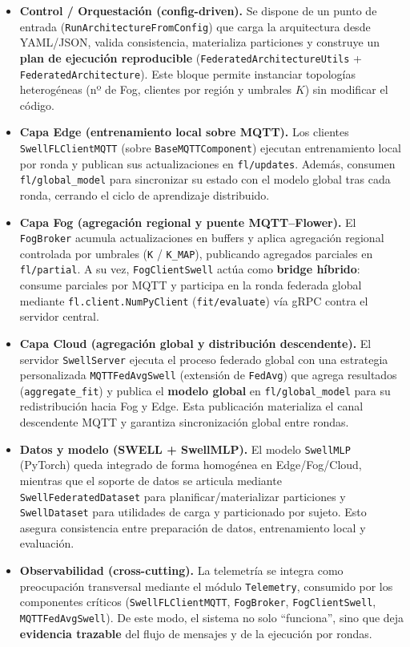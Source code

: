 \documentclass{report}
\begin{document}
\begin{itemize}\setlength\itemsep{0.15em}
    \item \textbf{Control / Orquestación (config-driven).}
    Se dispone de un punto de entrada (\texttt{RunArchitectureFromConfig}) que carga la arquitectura desde YAML/JSON, valida consistencia, materializa particiones y construye un \textbf{plan de ejecución reproducible} (\texttt{FederatedArchitectureUtils} + \texttt{FederatedArchitecture}). Este bloque permite instanciar topologías heterogéneas (nº de Fog, clientes por región y umbrales $K$) sin modificar el código.

    \item \textbf{Capa Edge (entrenamiento local sobre MQTT).}
    Los clientes \texttt{SwellFLClientMQTT} (sobre \texttt{BaseMQTTComponent}) ejecutan entrenamiento local por ronda y publican sus actualizaciones en \texttt{fl/updates}. Además, consumen \texttt{fl/global\_model} para sincronizar su estado con el modelo global tras cada ronda, cerrando el ciclo de aprendizaje distribuido.

    \item \textbf{Capa Fog (agregación regional y puente MQTT--Flower).}
    El \texttt{FogBroker} acumula actualizaciones en buffers y aplica agregación regional controlada por umbrales (\texttt{K} / \texttt{K\_MAP}), publicando agregados parciales en \texttt{fl/partial}. A su vez, \texttt{FogClientSwell} actúa como \textbf{bridge híbrido}: consume parciales por MQTT y participa en la ronda federada global mediante \texttt{fl.client.NumPyClient} (\texttt{fit/evaluate}) vía gRPC contra el servidor central.

    \item \textbf{Capa Cloud (agregación global y distribución descendente).}
    El servidor \texttt{SwellServer} ejecuta el proceso federado global con una estrategia personalizada \texttt{MQTTFedAvgSwell} (extensión de \texttt{FedAvg}) que agrega resultados (\texttt{aggregate\_fit}) y publica el \textbf{modelo global} en \texttt{fl/global\_model} para su redistribución hacia Fog y Edge. Esta publicación materializa el canal descendente MQTT y garantiza sincronización global entre rondas.

    \item \textbf{Datos y modelo (SWELL + SwellMLP).}
    El modelo \texttt{SwellMLP} (PyTorch) queda integrado de forma homogénea en Edge/Fog/Cloud, mientras que el soporte de datos se articula mediante \texttt{SwellFederatedDataset} para planificar/materializar particiones y \texttt{SwellDataset} para utilidades de carga y particionado por sujeto. Esto asegura consistencia entre preparación de datos, entrenamiento local y evaluación.

    \item \textbf{Observabilidad (cross-cutting).}
    La telemetría se integra como preocupación transversal mediante el módulo \texttt{Telemetry}, consumido por los componentes críticos (\texttt{SwellFLClientMQTT}, \texttt{FogBroker}, \texttt{FogClientSwell}, \texttt{MQTTFedAvgSwell}). De este modo, el sistema no solo “funciona”, sino que deja \textbf{evidencia trazable} del flujo de mensajes y de la ejecución por rondas.
\end{itemize}
\end{document}
